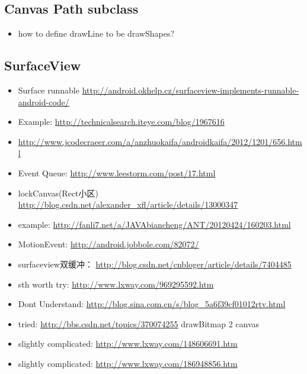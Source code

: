 \documentclass[9pt,b5paper]{article}
\begin{document}
\subsection{Canvas Path subclass}
\label{sec-2-4}
\begin{itemize}
\item how to define drawLine to be drawShapes?
\end{itemize}
\subsection{SurfaceView}
\label{sec-2-5}
\begin{itemize}
\item Surface runnable \url{http://android.okhelp.cz/surfaceview-implements-runnable-android-code/}
\item Example: \url{http://technicalsearch.iteye.com/blog/1967616}
\item \url{http://www.jcodecraeer.com/a/anzhuokaifa/androidkaifa/2012/1201/656.html}
\item Event Queue: \url{http://www.leestorm.com/post/17.html}
\item lockCanvas(Rect小区) \url{http://blog.csdn.net/alexander_xfl/article/details/13000347}
\item example: \url{http://fanli7.net/a/JAVAbiancheng/ANT/20120424/160203.html}
\item MotionEvent: \url{http://android.jobbole.com/82072/}
\item surfaceview双缓冲： \url{http://blog.csdn.net/cnbloger/article/details/7404485}
\item sth worth try: \url{http://www.lxway.com/969295592.htm}
\item Dont Understand: \url{http://blog.sina.com.cn/s/blog_5a6f39cf01012rtv.html}
\item tried: \url{http://bbs.csdn.net/topics/370074255} drawBitmap 2 canvas
\item slightly complicated: \url{http://www.lxway.com/148606691.htm}
\item slightly complicated: \url{http://www.lxway.com/186948856.htm}
\end{itemize}
\end{document}
